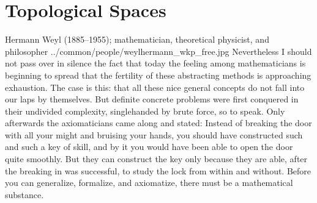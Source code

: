 
\section{Topological Spaces}
\label{app:topology}


%
\qboxnpq
  {
    Hermann Weyl (1885--1955); mathematician, theoretical physicist, and philosopher
    \footnotemark
  }
  {../common/people/weylhermann_wkp_free.jpg}
  {Nevertheless I should not pass over in silence the fact that today the feeling among mathematicians is beginning to spread that the fertility of these abstracting methods is approaching exhaustion. The case is this: that all these nice general concepts do not fall into our laps by themselves. But definite concrete problems were first conquered in their undivided complexity, singlehanded by brute force, so to speak. Only afterwards the axiomaticians came along and stated: Instead of breaking the door with all your might and bruising your hands, you should have constructed such and such a key of skill, and by it you would have been able to open the door quite smoothly. But they can construct the key only because they are able, after the breaking in was successful, to study the lock from within and without. Before you can generalize, formalize, and axiomatize, there must be a mathematical substance.}

